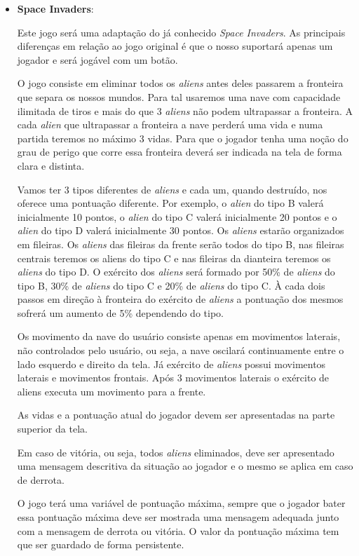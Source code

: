 \documentclass[a4paper,11pt]{article}
\newcommand{\sepitem}{\vspace{0.1in}\item}
\begin{document}
\begin{itemize}
\sepitem \textbf{Space Invaders}:

Este jogo será uma adaptação do já conhecido {\it Space Invaders}.
As principais diferenças em relação ao jogo original é que o nosso suportará apenas um jogador e será jogável com um botão.

O jogo consiste em eliminar todos os {\it aliens} antes deles passarem a fronteira que separa os nossos mundos.
Para tal usaremos uma nave com capacidade ilimitada de tiros e mais do que 3 {\it aliens} não podem ultrapassar a fronteira.
A cada {\it alien} que ultrapassar a fronteira a nave perderá uma vida e numa partida teremos no máximo 3 vidas.
Para que o jogador tenha uma noção do grau de perigo que corre essa fronteira deverá ser indicada na tela de forma clara e distinta.

Vamos ter 3 tipos diferentes de {\it aliens} e cada um, quando destruído, nos oferece uma pontuação diferente. Por exemplo, o {\it alien} do tipo B
valerá inicialmente 10 pontos, o {\it alien} do tipo C valerá inicialmente 20 pontos e o {\it alien} do tipo D valerá inicialmente 30 pontos.
Os {\it aliens} estarão organizados em fileiras. Os {\it aliens} das fileiras da frente serão todos do tipo B, nas fileiras centrais teremos os aliens
do tipo C e nas fileiras da dianteira teremos os {\it aliens} do tipo D. O exército dos {\it aliens} será formado por 50\% de {\it aliens} do tipo B, 30\%
de {\it aliens} do tipo C e 20\% de {\it aliens} do tipo C. À cada dois passos em direção à fronteira do exército de {\it aliens} a pontuação dos mesmos sofrerá
um aumento de 5\% dependendo do tipo.

Os movimento da nave do usuário consiste apenas em movimentos laterais, não controlados pelo usuário, ou seja, a nave oscilará continuamente
entre o lado esquerdo e direito da tela. Já exército de {\it aliens} possui movimentos laterais e movimentos frontais. Após 3 movimentos laterais
o exército de aliens executa um movimento para a frente.

As vidas e a pontuação atual do jogador devem ser apresentadas na parte superior da tela.

Em caso de vitória, ou seja, todos {\it aliens} eliminados, deve ser apresentado uma mensagem descritiva da situação ao jogador e o mesmo se aplica em
caso de derrota.

O jogo terá uma variável de pontuação máxima, sempre que o jogador bater essa pontuação máxima deve ser mostrada uma mensagem adequada junto com a
mensagem de derrota ou vitória. O valor da pontuação máxima tem que ser guardado de forma persistente.


\end{itemize}
\end{document}
